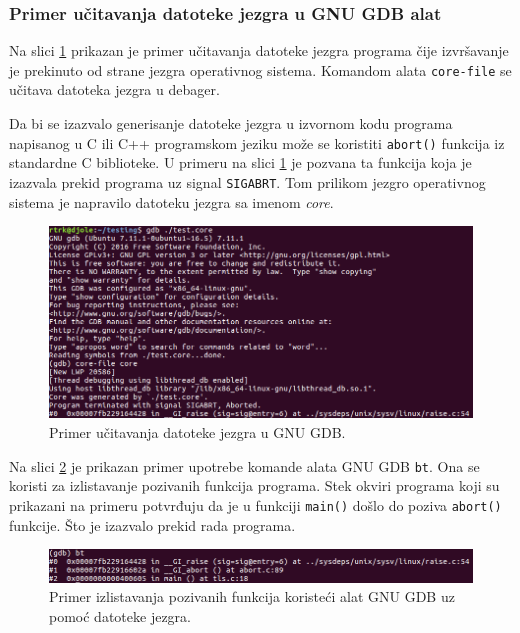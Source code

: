 \documentclass[12pt,oneside]{memoir}
\begin{document}
\subsubsection{Primer učitavanja datoteke jezgra u GNU GDB alat}

Na slici \ref{fig:ucitavanje_core} prikazan je primer učitavanja datoteke jezgra programa čije izvršavanje je prekinuto od strane jezgra operativnog sistema. Komandom alata \texttt{core-file} se učitava datoteka jezgra u debager.

Da bi se izazvalo generisanje datoteke jezgra u izvornom kodu programa napisanog u C ili C++ programskom jeziku može se koristiti \texttt{abort()} funkcija iz standardne C biblioteke. U primeru na slici \ref{fig:ucitavanje_core} je pozvana ta funkcija koja je izazvala prekid programa uz signal \texttt{SIGABRT}. Tom prilikom jezgro operativnog sistema je napravilo datoteku jezgra sa imenom \emph{core}.

\begin{figure}[h!]
	\begin{center}
		\includegraphics[scale=0.5]{slike/ucitanje_core.png}
	\end{center}
	\caption{Primer učitavanja datoteke jezgra u GNU GDB.}
	\label{fig:ucitavanje_core}
\end{figure}

Na slici \ref{fig:bt_core} je prikazan primer upotrebe komande alata GNU GDB \texttt{bt}. Ona se koristi za izlistavanje pozivanih funkcija programa. Stek okviri programa koji su prikazani na primeru potvrđuju da je u funkciji \texttt{main()} došlo do poziva \texttt{abort()} funkcije. Što je izazvalo prekid rada programa.

\begin{figure}[h!]
	\begin{center}
		\includegraphics[scale=0.5]{slike/bt_core.png}
	\end{center}
	\caption{Primer izlistavanja pozivanih funkcija koristeći alat GNU GDB uz pomoć datoteke jezgra.}
	\label{fig:bt_core}
\end{figure}
\end{document}
